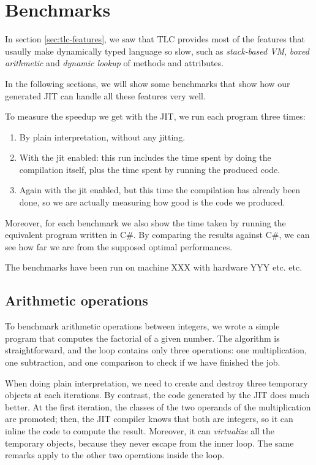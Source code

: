 \section{Benchmarks}

In section \ref{sec:tlc-features}, we saw that TLC provides most of the
features that usaully make dynamically typed language so slow, such as
\emph{stack-based VM}, \emph{boxed arithmetic} and \emph{dynamic lookup} of
methods and attributes.

In the following sections, we will show some benchmarks that show how our
generated JIT can handle all these features very well.

To measure the speedup we get with the JIT, we run each program three times:

\begin{enumerate}
\item By plain interpretation, without any jitting.
\item With the jit enabled: this run includes the time spent by doing the
  compilation itself, plus the time spent by running the produced code.
\item Again with the jit enabled, but this time the compilation has already
  been done, so we are actually measuring how good is the code we produced.
\end{enumerate}

Moreover, for each benchmark we also show the time taken by running the
equivalent program written in C\#.  By comparing the results against C\#, we
can see how far we are from the supposed optimal performances.  

The benchmarks have been run on machine XXX with hardware YYY etc. etc.

\subsection{Arithmetic operations}

To benchmark arithmetic operations between integers, we wrote a simple program
that computes the factorial of a given number.  The algorithm is
straightforward, and the loop contains only three operations: one
multiplication, one subtraction, and one comparison to check if we have
finished the job.

When doing plain interpretation, we need to create and destroy three temporary
objects at each iterations.  By contrast, the code generated by the JIT does
much better.  At the first iteration, the classes of the two operands of the
multiplication are promoted; then, the JIT compiler knows that both are
integers, so it can inline the code to compute the result.  Moreover, it can
\emph{virtualize} all the temporary objects, because they never escape from
the inner loop.  The same remarks apply to the other two operations inside
the loop.

